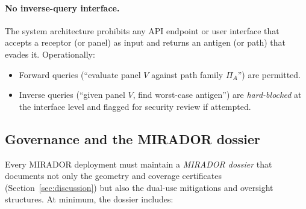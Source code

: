 \documentclass[11pt]{article}
\begin{document}
\paragraph{No inverse-query interface.}
The system architecture prohibits any API endpoint or user interface that accepts a receptor
(or panel) as input and returns an antigen (or path) that evades it. Operationally:
\begin{itemize}
  \item Forward queries (``evaluate panel $V$ against path family $\Pi_A$'') are permitted.
  \item Inverse queries (``given panel $V$, find worst-case antigen'') are \emph{hard-blocked}
        at the interface level and flagged for security review if attempted.
\end{itemize}

\subsection{Governance and the MIRADOR dossier}
\label{subsec:governance-dossier}

Every MIRADOR deployment must maintain a \emph{MIRADOR dossier} that documents not only the
geometry and coverage certificates (Section~\ref{sec:discussion}) but also the dual-use
mitigations and oversight structures. At minimum, the dossier includes:
\end{document}

